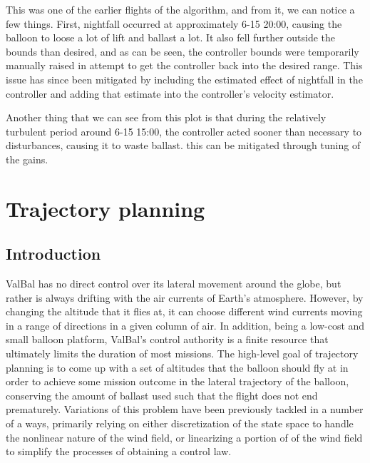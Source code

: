 \documentclass[11pt]{scrartcl} %
\begin{document}
This was one of the earlier flights of the algorithm, and from it, we can notice a few things. First, nightfall occurred at approximately 6-15 20:00, causing the balloon to loose a lot of lift and ballast a lot. It also fell further outside the bounds than desired, and as can be seen, the controller bounds were temporarily manually raised in attempt to get the controller back into the desired range. This issue has since been mitigated by including the estimated effect of nightfall in the controller  and adding that estimate into the controller's velocity estimator.

Another thing that we can see from this plot is that during the relatively turbulent period around 6-15 15:00, the controller acted sooner than necessary to disturbances, causing it to waste ballast. this can be mitigated through tuning of the gains.

\newpage
\section{Trajectory planning}
\label{TP}

\subsection{Introduction}


ValBal \cite{vb1} \cite{vb2} has no direct control over its lateral movement around the globe, but rather is always drifting with the air currents of Earth's atmosphere. However, by changing the altitude that it flies at, it can choose different wind currents moving in a range of directions in a given column of air. In addition, being a low-cost and small balloon platform, ValBal's control authority is a finite resource that ultimately limits the duration of most missions. The high-level goal of trajectory planning is to come up with a set of altitudes that the balloon should fly at in order to achieve some mission outcome in the lateral trajectory of the balloon, conserving the amount of ballast used such that the flight does not end prematurely. Variations of this problem have been previously tackled in a number of a ways, primarily relying on either discretization of the state space to handle the nonlinear nature of the wind field, or linearizing a portion of of the wind field to simplify the processes of obtaining a control law. 
\end{document}
